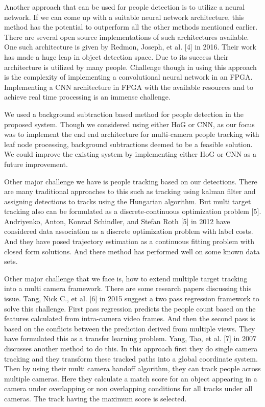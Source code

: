 \documentclass[12pt,a4paper]{report}
\begin{document}
Another approach that can be used for people detection is to utilize a neural network. If we can come up with a suitable neural network architecture, this method has the potential to outperform all the other methods mentioned earlier. There are several open source implementations of such architectures available. One such architecture is given by Redmon, Joseph, et al. [4] in 2016. Their work has made a huge leap in object detection space. Due to its success their architecture is utilized by many people. Challenge though in using this approach is the complexity of implementing a convolutional neural network in an FPGA.  Implementing a CNN architecture in FPGA with the available resources and to achieve real time processing is an immense challenge. \vspace{0.3cm}

We used a background subtraction based method for people detection in the proposed system. Though we considered using either HoG or CNN, as our focus was to implement the end end architecture for multi-camera people tracking with leaf node processing, background subtractions deemed to be a feasible solution. We could improve the existing system by implementing either HoG or CNN as a future improvement.\vspace{0.3cm}

Other major challenge we have is people tracking based on our detections. There are many traditional approaches to this such as tracking using kalman filter and assigning detections to tracks using the Hungarian algorithm. But multi target tracking also can be formulated as a discrete-continuous optimization problem [5]. Andriyenko, Anton, Konrad Schindler, and Stefan Roth [5] in 2012 have considered data association as a discrete optimization problem with label costs. And they have posed trajectory estimation as a continuous fitting problem with closed form solutions. And there method has performed well on some known data sets.\vspace{0.3cm}

Other major challenge that we face is, how to extend multiple target tracking into a multi camera framework. There are some research papers discussing this issue. Tang, Nick C., et al. [6] in 2015 suggest a two pass regression framework to solve this challenge. First pass regression predicts the people count based on the features calculated from intra-camera video frames. And then the second pass is based on the conflicts between the prediction derived from multiple views. They have formulated this as a transfer learning problem. Yang, Tao, et al. [7] in 2007 discusses another method to do this. In this approach first they do single camera tracking and they transform these tracked paths into a global coordinate system. Then by using their multi camera handoff algorithm, they can track people across multiple cameras. Here they calculate a match score for an object appearing in a camera under overlapping or non overlapping conditions for all tracks under all cameras. The track having the maximum score is selected.\vspace{0.3cm}
\end{document}
